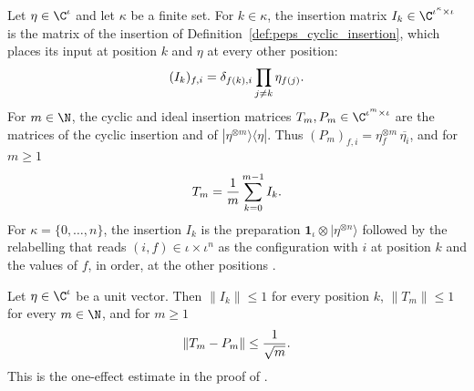 \begin{definition}
    \label{def:party_insertion_matrices}
    \leanok
    Let $\eta\in\C^\iota$ and let $\kappa$ be a finite set. For $k\in\kappa$,
    the insertion matrix $I_k\in\C^{\iota^\kappa\times\iota}$ is the matrix
    of the insertion of Definition~\ref{def:peps_cyclic_insertion}, which
    places its input at position $k$ and $\eta$ at every other position:
    \begin{align}
        (I_k)_{f,i}=\delta_{f(k),i}\prod_{j\neq k}\eta_{f(j)}.
        \notag
    \end{align}
    For $m\in\N$, the cyclic and ideal insertion matrices
    $T_m,P_m\in\C^{\iota^m\times\iota}$ are the matrices of the cyclic
    insertion and of $|\eta^{\otimes m}\rangle\langle\eta|$. Thus
    $(P_m)_{f,i}=\eta^{\otimes m}_f\,\overline{\eta_i}$, and for $m\ge1$
    \begin{align}
        T_m=\frac1m\sum_{k=0}^{m-1}I_k.
        \notag
    \end{align}
    For $\kappa=\{0,\dots,n\}$, the insertion $I_k$ is the preparation
    $\mathbf 1_\iota\otimes|\eta^{\otimes n}\rangle$ followed by the
    relabelling that reads $(i,f)\in\iota\times\iota^n$ as the
    configuration with $i$ at position $k$ and the values of $f$, in
    order, at the other positions \cite[proof of
        Lemma~5.1]{OpenAI2026PolynomialPEPS}.
\end{definition}

\begin{theorem}
    \label{thm:party_insertion_matrix_norms}
    \leanok
    Let $\eta\in\C^\iota$ be a unit vector. Then $\lVert I_k\rVert\le1$
    for every position $k$, $\lVert T_m\rVert\le1$ for every $m\in\N$, and
    for $m\ge1$
    \begin{align}
        \lVert T_m-P_m\rVert\le\frac1{\sqrt m}.
        \notag
    \end{align}
    This is the one-effect estimate in the proof of
    \cite[Lemma~5.1]{OpenAI2026PolynomialPEPS}.
\end{theorem}

